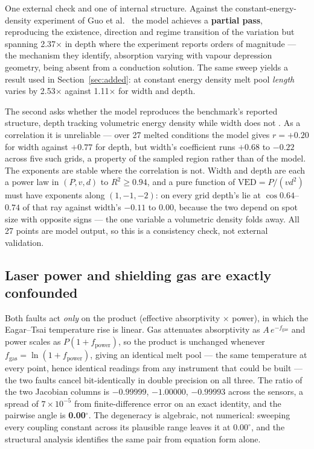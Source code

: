 \documentclass[preprint,times]{elsarticle}
\begin{document}
One external check and one of internal structure. Against the
constant-energy-density experiment of Guo et al.\ \cite{Guo2019} the model
achieves a \textbf{partial pass}, reproducing the existence, direction and regime
transition of the variation but spanning 2.37$\times$ in depth where the
experiment reports orders of magnitude --- the mechanism they identify,
absorption varying with vapour depression geometry, being absent from a
conduction solution. The same sweep yields a result used in
Section~\ref{sec:added}: at constant energy density melt pool \emph{length}
varies by 2.53$\times$ against 1.11$\times$ for width and depth.

The second asks whether the model reproduces the benchmark's reported structure,
depth tracking volumetric energy density while width does not \cite{Weaver2024}.
As a correlation it is unreliable --- over 27 melted conditions the model gives
$r=+0.20$ for width against $+0.77$ for depth, but width's coefficient runs
$+0.68$ to $-0.22$ across five such grids, a property of the sampled region
rather than of the model. The exponents are stable where the correlation is not.
Width and depth are each a power law in $(P,v,d)$ to $R^{2}\ge0.94$, and a pure function
of $\mathrm{VED}=P/(vd^{2})$ must have exponents along $(1,-1,-2)$: on every grid
depth's lie at $\cos 0.64$--$0.74$ of that ray against width's $-0.11$ to
$0.00$, because the two depend on spot size with opposite signs --- the one
variable a volumetric density folds away. All 27 points are model output, so this
is a consistency check, not external validation.

\subsection{Laser power and shielding gas are exactly confounded}
\label{sec:confound}

Both faults act \emph{only} on the product (effective absorptivity $\times$
power), in which the Eagar--Tsai temperature rise is linear. Gas attenuates
absorptivity as $A\,e^{-f_{\mathrm{gas}}}$ and power scales as
$P(1+f_{\mathrm{power}})$, so the product is unchanged whenever
$f_{\mathrm{gas}}=\ln(1+f_{\mathrm{power}})$, giving an identical melt pool ---
the same temperature at every point, hence identical readings from any instrument
that could be built --- the two faults cancel bit-identically in double
precision on all three. The
ratio of the two Jacobian columns is $-0.99999$, $-1.00000$, $-0.99993$ across
the sensors, a spread of $7\times10^{-5}$ from finite-difference error on an
exact identity, and the pairwise angle is \textbf{0.00$^\circ$}. The degeneracy
is algebraic, not numerical: sweeping every coupling constant across its
plausible range leaves it at $0.00^\circ$, and the structural analysis identifies
the same pair from equation form alone.
\end{document}
